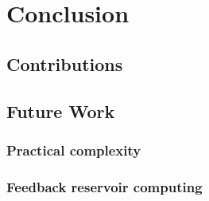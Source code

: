 \chapter{Conclusion}

%
\section{Contributions}
\section{Future Work}

\subsection{Practical complexity}

\subsection{Feedback reservoir computing}

